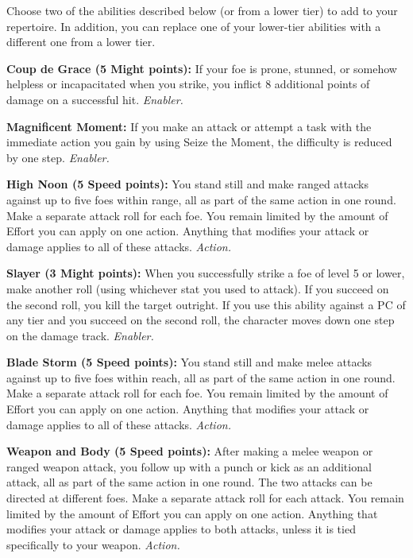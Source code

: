 \documentclass[a4paper,10pt,final,twocolumn,oneside]{book}
\newcommand{\itemAbility}[2]{\textcolor{25gray}{\textbullet\textbf{ #1:}}{ #2}\par}
\newcommand{\enabler}{\textit{ Enabler.}}
\newcommand{\action}{\textit{ Action.}}
\begin{document}
Choose two of the abilities described below (or from a lower tier) to add to your repertoire. In addition, you can replace one of your lower-tier abilities with a different one from a lower tier.

\itemAbility{Coup de Grace (5 Might points)}{If your foe is prone, stunned, or somehow helpless or incapacitated when you strike, you inflict 8 additional points of damage on a successful hit.\enabler}

\itemAbility{Magnificent Moment}{If you make an attack or attempt a task with the immediate action you gain by using Seize the Moment, the difficulty is reduced by one step.\enabler}

\itemAbility{High Noon (5 Speed points)}{You stand still and make ranged attacks against up to five foes within range, all as part of the same action in one round. Make a separate attack roll for each foe. You remain limited by the amount of Effort you can apply on one action. Anything that modifies your attack or damage applies to all of these attacks.\action}

\itemAbility{Slayer (3 Might points)}{When you successfully strike a foe of level 5 or lower, make another roll (using whichever stat you used to attack). If you succeed on the second roll, you kill the target outright. If you use this ability against a PC of any tier and you succeed on the second roll, the character moves down one step on the damage track.\enabler}

\itemAbility{Blade Storm (5 Speed points)}{You stand still and make melee attacks against up to five foes within reach, all as part of the same action in one round. Make a separate attack roll for each foe. You remain limited by the amount of Effort you can apply on one action. Anything that modifies your attack or damage applies to all of these attacks.\action}

\itemAbility{Weapon and Body (5 Speed points)}{After making a melee weapon or ranged weapon attack, you follow up with a punch or kick as an additional attack, all as part of the same action in one round. The two attacks can be directed at different foes. Make a separate attack roll for each attack. You remain limited by the amount of Effort you can apply on one action. Anything that modifies your attack or damage applies to both attacks, unless it is tied specifically to your weapon.\action}

\clearpage


%
%
%
%
%
%
%
%
%
%
%
%
%
%
%
%
%
%
%
\end{document}

